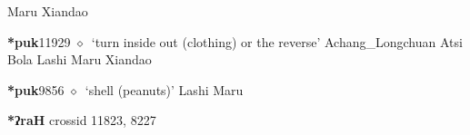 \begin{list}{}{\leftmargin=1.5em \itemindent=-1.5em}
         Maru 
\hspace{1ex}
         Xiandao 
  \item {\footnotesize \textbf{*puk}}{\tiny 11929}
\hspace{1ex}
         $\diamond$~`turn inside out (clothing) or the reverse'
         Achang\_Longchuan 
\hspace{1ex}
         Atsi 
\hspace{1ex}
         Bola 
\hspace{1ex}
         Lashi 
\hspace{1ex}
         Maru 
\hspace{1ex}
         Xiandao 
  \item {\footnotesize \textbf{*puk}}{\tiny 9856}
\hspace{1ex}
         $\diamond$~`shell (peanuts)'
         Lashi 
\hspace{1ex}
         Maru 
  \end{list}
\item
\textbf{*ʔraH}
  {\tiny crossid 11823, 8227}
